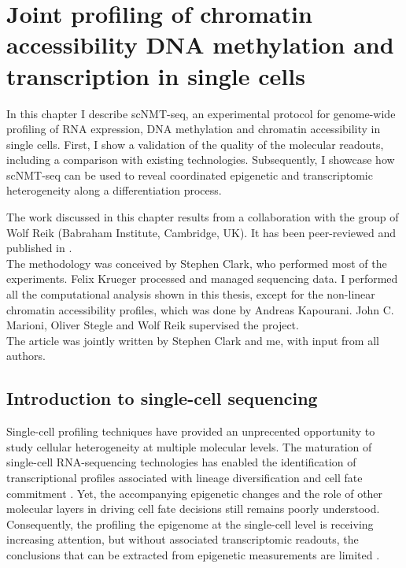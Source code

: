 \graphicspath{{Chapter1/Figs/}}

\chapter{Joint profiling of chromatin accessibility DNA methylation and transcription in single cells}

In this chapter I describe scNMT-seq, an experimental protocol for genome-wide profiling of RNA expression, DNA methylation and chromatin accessibility in single cells. First, I show a validation of the quality of the molecular readouts, including a comparison with existing technologies. Subsequently, I showcase how scNMT-seq can be used to reveal coordinated epigenetic and transcriptomic heterogeneity along a differentiation process.

The work discussed in this chapter results from a collaboration with the group of Wolf Reik (Babraham Institute, Cambridge, UK). It has been peer-reviewed and published in \cite{Clark2018}.\\
The methodology was conceived by Stephen Clark, who performed most of the experiments. Felix Krueger processed and managed sequencing data. I performed all the computational analysis shown in this thesis, except for the non-linear chromatin accessibility profiles, which was done by Andreas Kapourani. John C. Marioni, Oliver Stegle and Wolf Reik supervised the project.\\
The article was jointly written by Stephen Clark and me, with input from all authors.

\section{Introduction to single-cell sequencing}

Single-cell profiling techniques have provided an unprecented opportunity to study cellular heterogeneity at multiple molecular levels. The maturation of single-cell RNA-sequencing technologies has enabled the identification of transcriptional profiles associated with lineage diversification and cell fate commitment \cite{Kolodziejczyk2015,Griffiths2018,Papalexi2017,Patel2014}. Yet, the accompanying epigenetic changes and the role of other molecular layers in driving cell fate decisions still remains poorly understood. Consequently, the profiling the epigenome at the single-cell level is receiving increasing attention, but without associated transcriptomic readouts, the conclusions that can be extracted from epigenetic measurements are limited \cite{Stuart2019,Kelsey2017,Griffiths2018}.

